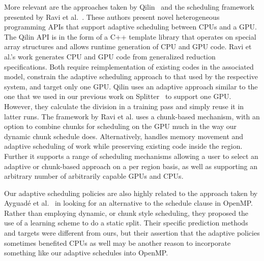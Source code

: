 More relevant are the approaches taken by Qilin~\cite{Luk:2009gf} and the
scheduling framework presented by Ravi et al.~\cite{Ravi:2011ie,Ravi:2010hw}.
These authors present novel heterogeneous programming APIs that support
adaptive scheduling between CPUs and a GPU. The Qilin API is in the form of a
C++ template library that operates on special array structures and allows
runtime generation of CPU and GPU code. Ravi et al.'s work generates CPU and
GPU code from generalized reduction specifications. Both require
reimplementation of existing codes in the associated model, constrain the
adaptive scheduling approach to that used by the respective system, and target
only one GPU. Qilin uses an adaptive approach similar to the one that we used
in our previous work on Splitter~\cite{Scogland:2012br} to support one GPU.
However, they calculate the division in a training pass and simply reuse it in
latter runs. The framework by Ravi et al. uses a chunk-based mechanism, with
an option to combine chunks for scheduling on the GPU much in the way our
dynamic chunk schedule does.  Alternatively, \tsar handles memory movement and
adaptive scheduling of work while preserving existing code inside the region.
Further it supports a range of scheduling mechanisms allowing a user to select
an adaptive or chunk-based approach on a per region basis, as well as
supporting an arbitrary number of arbitrarily capable GPUs and CPUs.

Our adaptive scheduling policies are also highly related to the approach taken
by Ayguad\'e et al.~\cite{Ayguade:2003tw} in looking for an alternative to the
schedule clause in OpenMP.  Rather than employing dynamic, or chunk style
scheduling, they proposed the use of a learning scheme to do a static split.
Their specific prediction methods and targets were different from ours, but
their assertion that the adaptive policies sometimes benefited CPUs as well
may be another reason to incorporate something like our adaptive schedules into
OpenMP.




